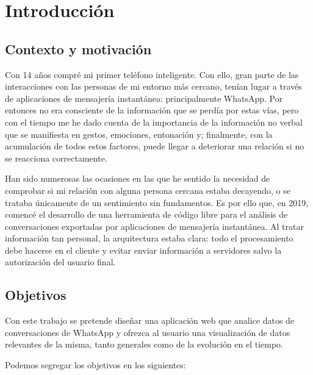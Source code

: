 \chapter{Introducción}
\label{chap:introduction}

\section{Contexto y motivación}
\label{sec:context}

Con 14 años compré mi primer teléfono inteligente. Con ello, gran parte de las interacciones con las personas de mi entorno más cercano, tenían lugar a través de aplicaciones de mensajería instantánea: principalmente WhatsApp. Por entonces no era consciente de la información que se perdía por estas vías, pero con el tiempo me he dado cuenta de la importancia de la información no verbal que se manifiesta en gestos, emociones, entonación y; finalmente, con la acumulación de todos estos factores, puede llegar a deteriorar una relación si no se reacciona correctamente.

Han sido numerosas las ocasiones en las que he sentido la necesidad de comprobar si mi relación con alguna persona cercana estaba decayendo, o se trataba únicamente de un sentimiento sin fundamentos. Es por ello que, en 2019, comencé el desarrollo de una herramienta de código libre para el análisis de conversaciones exportadas por aplicaciones de mensajería instantánea. Al tratar información tan personal, la arquitectura estaba clara: todo el procesamiento debe hacerse en el cliente y evitar enviar información a servidores salvo la autorización del usuario final.

\section{Objetivos}
\label{sec:project-goals}


Con este trabajo se pretende diseñar una aplicación web que analice datos de conversaciones de WhatsApp y ofrezca al usuario una visualización de datos relevantes de la misma, tanto generales como de la evolución en el tiempo.

Podemos segregar los objetivos en los siguientes:

